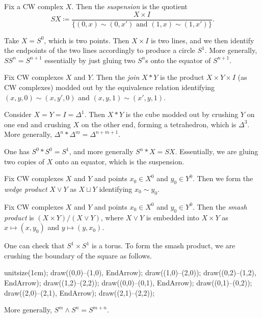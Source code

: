 \documentclass[../notes.tex]{subfiles}
\begin{document}
\begin{definition}[suspension]
	Fix a CW complex $X$. Then the \textit{suspension} is the quotient
	\[SX\coloneqq\frac{X\times I}{\{(0,x)\sim(0,x')\text{ and }(1,x)\sim(1,x')\}}.\]
\end{definition}
\begin{example}
	Take $X=S^0$, which is two points. Then $X\times I$ is two lines, and we then identify the endpoints of the two lines accordingly to produce a circle $S^1$. More generally, $SS^n=S^{n+1}$ essentially by just gluing two $S^n$s onto the equator of $S^{n+1}$.
\end{example}
\begin{definition}[join]
	Fix CW complexes $X$ and $Y$. Then the \textit{join} $X*Y$ is the product $X\times Y\times I$ (as CW complexes) modded out by the equivalence relation identifying $(x,y,0)\sim(x,y',0)$ and $(x,y,1)\sim(x',y,1)$.
\end{definition}
\begin{example}[simplex]
	Consider $X=Y=I=\Delta^1$. Then $X*Y$ is the cube modded out by crushing $Y$ on one end and crushing $X$ on the other end, forming a tetrahedron, which is $\Delta^3$. More generally, $\Delta^n*\Delta^m=\Delta^{n+m+1}$.
\end{example}
\begin{example}
	One has $S^0*S^0=S^1$, and more generally $S^n*X=SX$. Essentially, we are gluing two copies of $X$ onto an equator, which is the suspension.
\end{example}
\begin{definition}
	Fix CW complexes $X$ and $Y$ and points $x_0\in X^0$ and $y_0\in Y^0$. Then we form the \textit{wedge product} $X\lor Y$ as $X\sqcup Y$ identifying $x_0\sim y_0$.
\end{definition}
\begin{definition}
	Fix CW complexes $X$ and $Y$ and points $x_0\in X^0$ and $y_0\in Y^0$. Then the \textit{smash product} is $(X\times Y)/(X\lor Y)$, where $X\lor Y$ is embedded into $X\times Y$ as $x\mapsto(x,y_0)$ and $y\mapsto(y,x_0)$.
\end{definition}
\begin{example}
	One can check that $S^1\times S^1$ is a torus. To form the smash product, we are crushing the boundary of the square as follows.
	\begin{center}
		\begin{asy}
			unitsize(1cm);
			draw((0,0)--(1,0), EndArrow);
			draw((1,0)--(2,0));
			draw((0,2)--(1,2), EndArrow);
			draw((1,2)--(2,2));
			draw((0,0)--(0,1), EndArrow);
			draw((0,1)--(0,2));
			draw((2,0)--(2,1), EndArrow);
			draw((2,1)--(2,2));
		\end{asy}
	\end{center}
	More generally, $S^m\land S^n=S^{m+n}$.
\end{example}
\end{document}
